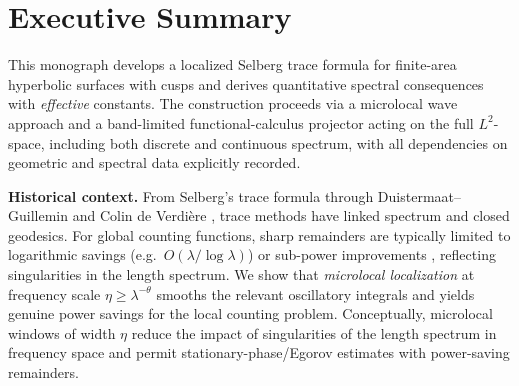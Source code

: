 
\section{Executive Summary}

This monograph develops a localized Selberg trace formula for finite-area
hyperbolic surfaces with cusps and derives quantitative spectral consequences
with \emph{effective} constants. The construction proceeds via a microlocal
wave approach and a band-limited functional-calculus projector acting on the
full $L^2$-space, including both discrete and continuous spectrum, with all
dependencies on geometric and spectral data explicitly recorded.

\medskip
\noindent\textbf{Historical context.}
From Selberg’s trace formula \cite{Selberg1956} through
Duistermaat–Guillemin \cite{DG1975} and Colin de Verdière \cite{CdV1980},
trace methods have linked spectrum and closed geodesics. For global counting
functions, sharp remainders are typically limited to logarithmic savings
(e.g.\ $O(\lambda/\log\lambda)$) or sub-power improvements \cite{Ivrii2016,Berger2019},
reflecting singularities in the length spectrum. We show that \emph{microlocal
localization} at frequency scale $\eta\ge \lambda^{-\theta}$ smooths the
relevant oscillatory integrals and yields genuine power savings for the local
counting problem. Conceptually, microlocal windows of width $\eta$ reduce the
impact of singularities of the length spectrum in frequency space and permit
stationary-phase/Egorov estimates with power-saving remainders.

